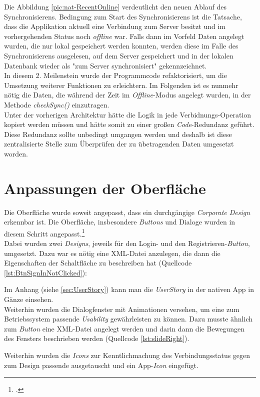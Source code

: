 Die Abbildung \ref{pic:nat-RecentOnline} verdeutlicht den neuen Ablauf des Synchronisierens. Bedingung zum Start des Synchronisierens ist die Tatsache, dass die Applikation aktuell eine Verbindung zum Server besitzt und im vorhergehenden Status noch \textit{offline} war. Falls dann im Vorfeld Daten angelegt wurden, die nur lokal gespeichert werden konnten, werden diese im Falle des Synchronisierens ausgelesen, auf dem Server gespeichert und in der lokalen Datenbank wieder als "zum Server synchronisiert" gekennzeichnet.\\
In diesem 2. Meilenstein wurde der Programmcode refaktorisiert, um die Umsetzung weiterer Funktionen zu erleichtern. Im Folgenden ist es nunmehr nötig die Daten, die während der Zeit im \textit{Offline}-Modus angelegt wurden, in der Methode \textit{checkSync()} einzutragen.\\
Unter der vorherigen Architektur hätte die Logik in jede Verbidnungs-Operation kopiert werden müssen und hätte somit zu einer großen \textit{Code}-Redundanz geführt. Diese Redundanz sollte unbedingt umgangen werden und deshalb ist diese zentralisierte Stelle zum Überprüfen der zu übetragenden Daten umgesetzt worden.

\section{Anpassungen der Oberfläche}
\label{sec:anpassungen-oberflaeche}
Die Oberfläche wurde soweit angepasst, dass ein durchgängige \textit{Corporate Design} erkennbar ist. Die Oberfläche, insbesondere \textit{Buttons} und Dialoge wurden in diesem Schritt angepasst.\footcite{Android-Oberflaechen}\\
Dabei wurden zwei \textit{Designs}, jeweils für den Login- und den Registrieren-\textit{Button}, umgesetzt. Dazu war es nötig eine \ac{XML}-Datei anzulegen, die dann die Eigenschaften der Schaltfläche zu beschreiben hat (Quellcode \ref{lst:BtnSignInNotClicked}):

Im Anhang (siehe \ref{sec:UserStory}) kann man die \textit{UserStory} in der nativen App in Gänze einsehen.\\ 
Weiterhin wurden die Dialogfenster mit Animationen versehen, um eine zum Betriebssystem passende \textit{Usability} gewährleisten zu können. Dazu musste ähnlich zum \textit{Button} eine \ac{XML}-Datei angelegt werden und darin dann die Bewegungen des Fensters beschrieben werden (Quellcode \ref{lst:slideRight}).

Weiterhin wurden die \textit{Icons} zur Kenntlichmachung des Verbindungsstatus gegen zum Design passende ausgetauscht und ein App-\textit{Icon} eingefügt.

